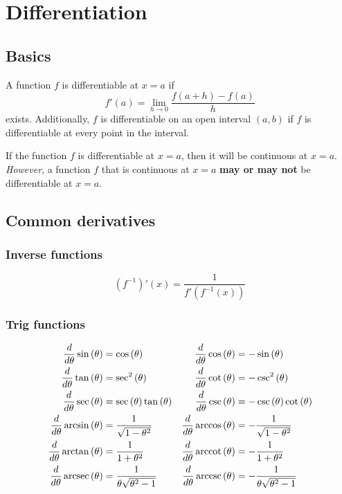 \documentclass[main.tex]{subfiles}
\begin{document}
\section{Differentiation}
	\subsection*{Basics}
	\begin{definition}[informal]
	A function \(f\) is differentiable at \(x = a\) if \[f'(a) = \lim_{h \to 0} \frac{f(a+h) - f(a)}{h}\] exists.
	Additionally, \(f\) is differentiable on an open interval \((a, b)\) if \(f\) is differentiable at every point in the interval.
	\end{definition}
	\begin{note}
	If the function \(f\) is differentiable at \(x = a\), then it will be continuous at \(x = a\).
	\emph{However}, a function \(f\) that is continuous at \(x = a\) \textbf{may or may not} be differentiable at \(x = a\).
	\end{note}

	\subsection*{Common derivatives}
	\subsubsection*{Inverse functions}
	\begin{equation*}
		(f^{-1})' (x) = \frac{1}{f'(f^{-1}(x))}
	\end{equation*}
	\subsubsection*{Trig functions}
	\begin{align*}
		\frac{d}{d\theta} \sin{(\theta)} &= \cos{(\theta)} & \frac{d}{d\theta} \cos{(\theta)} &= -\sin{(\theta)} \\
		\frac{d}{d\theta} \tan{(\theta)} &= \sec^2{(\theta)} &  \frac{d}{d\theta} \cot{(\theta)} &= -\csc^2{(\theta)} \\
		\frac{d}{d\theta} \sec{(\theta)} &= \sec{(\theta)}\tan{(\theta)} & \frac{d}{d\theta} \csc{(\theta)} &= -\csc{(\theta)}\cot{(\theta)} \\
		\frac{d}{d\theta} \arcsin{(\theta)} &= \frac{1}{\sqrt{1 - \theta^2}} & \frac{d}{d\theta} \arccos{(\theta)} &= -\frac{1}{\sqrt{1 - \theta^2}} \\
		\frac{d}{d\theta} \arctan{(\theta)} &= \frac{1}{1 + \theta^2} & \frac{d}{d\theta} \operatorname{arccot}{(\theta)} &= -\frac{1}{1 + \theta^2} \\
		\frac{d}{d\theta} \operatorname{arcsec}{(\theta)} &= \frac{1}{\theta \sqrt{\theta^2 - 1}} & \frac{d}{d\theta} \operatorname{arccsc}{(\theta)} &= -\frac{1}{\theta \sqrt{\theta^2 - 1}}
	\end{align*}
\end{document}

